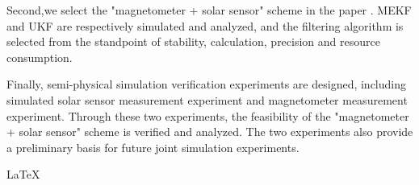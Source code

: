 \begin{spacing}{1.5}
\begin{center}
\begin{minipage}[b]{0.95\linewidth}
	Second,we select the "magnetometer + solar sensor" scheme in the paper . MEKF and UKF are respectively simulated and analyzed, and the filtering algorithm is selected from the standpoint of stability, calculation, precision and resource consumption.
	
	Finally, semi-physical simulation verification experiments are designed, including simulated solar sensor measurement experiment and magnetometer measurement experiment. Through these two experiments, the feasibility of the "magnetometer + solar sensor" scheme is verified and analyzed. The two experiments also provide a preliminary basis for future joint simulation experiments.
	
	\vspace{8ex}
{\bf{}}  \songti \qquad \LaTeX  \qquad \CTeX
	
\end{minipage}
\end{center}

\end{spacing} 
  




